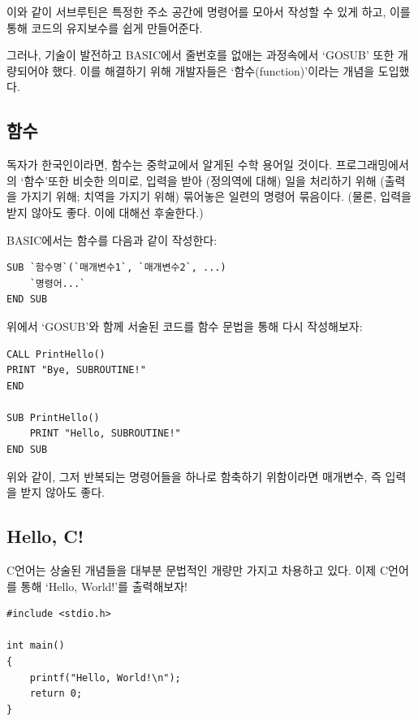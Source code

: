 \documentclass[a4paper,12pt]{book}
\begin{document}
이와 같이 서브루틴은 특정한 주소 공간에 명령어를 모아서 작성할 수 있게 하고,
이를 통해 코드의 유지보수를 쉽게 만들어준다.

그러나, 기술이 발전하고 BASIC에서 줄번호를 없애는 과정속에서 `GOSUB' 또한 개량되어야 했다.
이를 해결하기 위해 개발자들은 `함수(function)'이라는 개념을 도입했다.


\subsection{함수}

독자가 한국인이라면, 함수는 중학교에서 알게된 수학 용어일 것이다.
프로그래밍에서의 `함수'또한 비슷한 의미로,
입력을 받아 (정의역에 대해) 일을 처리하기 위해 (출력을 가지기 위해; 치역을 가지기 위해)
묶어놓은 일련의 명령어 묶음이다. (물론, 입력을 받지 않아도 좋다. 이에 대해선 후술한다.)

BASIC에서는 함수를 다음과 같이 작성한다:

\begin{lstlisting}[escapeinside=``]
SUB `함수명`(`매개변수1`, `매개변수2`, ...)
    `명령어...`
END SUB
\end{lstlisting}

위에서 `GOSUB'와 함께 서술된 코드를 함수 문법을 통해 다시 작성해보자:

\begin{lstlisting}
CALL PrintHello()
PRINT "Bye, SUBROUTINE!"
END

SUB PrintHello()
    PRINT "Hello, SUBROUTINE!"
END SUB
\end{lstlisting}

위와 같이, 그저 반복되는 명령어들을 하나로 함축하기 위함이라면 매개변수,
즉 입력을 받지 않아도 좋다.


\subsection{Hello, C!}
\label{sec:hello-c}

C언어는 상술된 개념들을 대부분 문법적인 개량만 가지고 차용하고 있다.
이제 C언어를 통해 `Hello, World!'를 출력해보자!


\begin{lstlisting}
#include <stdio.h>

int main()
{
    printf("Hello, World!\n");
    return 0;
}
\end{lstlisting}
\end{document}
